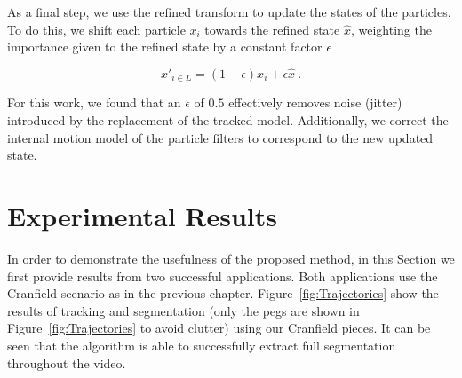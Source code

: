 As a final step, we use the refined transform to update the states of the particles. To do this, we shift each particle $x_i$ towards the refined state $\hat{x}$, weighting the importance given to the refined state by a constant factor $\epsilon$

\begin{equation}
\label{eqn:PFUpdate}
x'_{i \in L} = (1-\epsilon) x_i + \epsilon \hat{x}~.
\end{equation}

For this work, we found that an $\epsilon$ of $0.5$ effectively removes noise (jitter) introduced by the replacement of the tracked model. Additionally, we correct the internal motion model of the particle filters to correspond to the new updated state.

\section{Experimental Results}
In order to demonstrate the usefulness of the proposed method, in this Section we first provide results from two successful applications. Both applications use the Cranfield scenario \cite{collins1984development} as in the previous chapter. Figure~\ref{fig:Trajectories} show the results of tracking and segmentation (only the pegs are shown in Figure~\ref{fig:Trajectories} to avoid clutter) using our Cranfield pieces. It can be seen that the algorithm is able to successfully extract full segmentation throughout the video.

